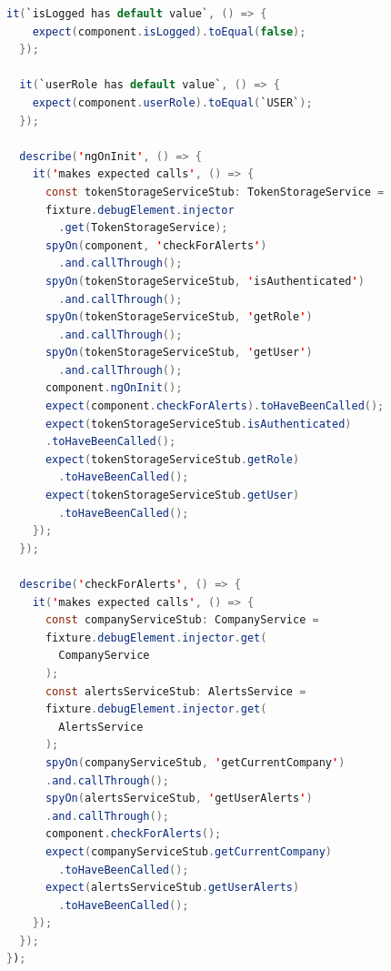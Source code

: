 \documentclass[twoside]{projektInzynierskiMS}
\numberwithin{figure}{section}
\begin{document}
\begin{lstlisting}[language=Java,caption=Testy jednostkowe aplikacji przeglądarkowej. Źródło: Opracowanie własne.,captionpos=b]
  it(`isLogged has default value`, () => {
    expect(component.isLogged).toEqual(false);
  });

  it(`userRole has default value`, () => {
    expect(component.userRole).toEqual(`USER`);
  });

  describe('ngOnInit', () => {
    it('makes expected calls', () => {
      const tokenStorageServiceStub: TokenStorageService =
      fixture.debugElement.injector
        .get(TokenStorageService);
      spyOn(component, 'checkForAlerts')
        .and.callThrough();
      spyOn(tokenStorageServiceStub, 'isAuthenticated')
        .and.callThrough();
      spyOn(tokenStorageServiceStub, 'getRole')
        .and.callThrough();
      spyOn(tokenStorageServiceStub, 'getUser')
        .and.callThrough();
      component.ngOnInit();
      expect(component.checkForAlerts).toHaveBeenCalled();
      expect(tokenStorageServiceStub.isAuthenticated)
      .toHaveBeenCalled();
      expect(tokenStorageServiceStub.getRole)
        .toHaveBeenCalled();
      expect(tokenStorageServiceStub.getUser)
        .toHaveBeenCalled();
    });
  });

  describe('checkForAlerts', () => {
    it('makes expected calls', () => {
      const companyServiceStub: CompanyService =
      fixture.debugElement.injector.get(
        CompanyService
      );
      const alertsServiceStub: AlertsService =
      fixture.debugElement.injector.get(
        AlertsService
      );
      spyOn(companyServiceStub, 'getCurrentCompany')
      .and.callThrough();
      spyOn(alertsServiceStub, 'getUserAlerts')
      .and.callThrough();
      component.checkForAlerts();
      expect(companyServiceStub.getCurrentCompany)
        .toHaveBeenCalled();
      expect(alertsServiceStub.getUserAlerts)
        .toHaveBeenCalled();
    });
  });
});
\end{lstlisting}
\end{document}
